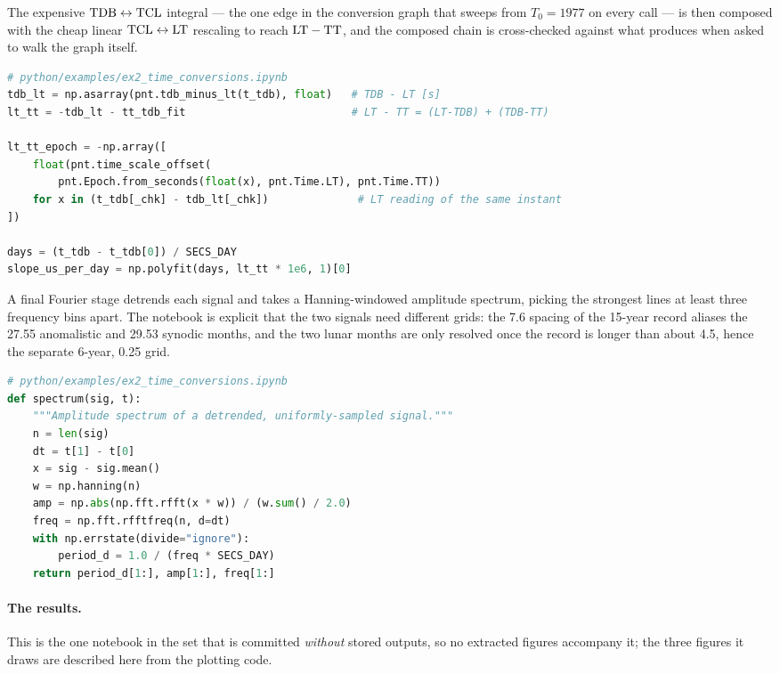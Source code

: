 The expensive $\mathrm{TDB}\leftrightarrow\mathrm{TCL}$ integral --- the one edge in the
conversion graph that sweeps from $T_0=1977$ on every call --- is then composed
with the cheap linear $\mathrm{TCL}\leftrightarrow\mathrm{LT}$ rescaling to reach $\mathrm{LT}-\mathrm{TT}$, and
the composed chain is cross-checked against what  produces when asked
to walk the graph itself.

\begin{lstlisting}[language=py, caption={Composing LT - TT from offsets, and checking it against Epoch.}, label={lst:tut-ex2-lt}]
# python/examples/ex2_time_conversions.ipynb
tdb_lt = np.asarray(pnt.tdb_minus_lt(t_tdb), float)   # TDB - LT [s]
lt_tt = -tdb_lt - tt_tdb_fit                          # LT - TT = (LT-TDB) + (TDB-TT)

lt_tt_epoch = -np.array([
    float(pnt.time_scale_offset(
        pnt.Epoch.from_seconds(float(x), pnt.Time.LT), pnt.Time.TT))
    for x in (t_tdb[_chk] - tdb_lt[_chk])              # LT reading of the same instant
])

days = (t_tdb - t_tdb[0]) / SECS_DAY
slope_us_per_day = np.polyfit(days, lt_tt * 1e6, 1)[0]
\end{lstlisting}

A final Fourier stage detrends each signal and takes a Hanning-windowed
amplitude spectrum, picking the strongest lines at least three frequency bins
apart. The notebook is explicit that the two signals need different grids: the
\SI{7.6}{\dayunit} spacing of the 15-year record aliases the \SI{27.55}{\dayunit}
anomalistic and \SI{29.53}{\dayunit} synodic months, and the two lunar months
are only resolved once the record is longer than about \SI{4.5}{\yr}, hence the
separate 6-year, \SI{0.25}{\dayunit} grid.

\begin{lstlisting}[language=py, caption={Amplitude spectrum of a detrended, uniformly sampled offset.}, label={lst:tut-ex2-fft}]
# python/examples/ex2_time_conversions.ipynb
def spectrum(sig, t):
    """Amplitude spectrum of a detrended, uniformly-sampled signal."""
    n = len(sig)
    dt = t[1] - t[0]
    x = sig - sig.mean()
    w = np.hanning(n)
    amp = np.abs(np.fft.rfft(x * w)) / (w.sum() / 2.0)
    freq = np.fft.rfftfreq(n, d=dt)
    with np.errstate(divide="ignore"):
        period_d = 1.0 / (freq * SECS_DAY)
    return period_d[1:], amp[1:], freq[1:]
\end{lstlisting}

\paragraph{The results.}
This is the one notebook in the set that is committed \emph{without} stored
outputs, so no extracted figures accompany it; the three figures it draws are
described here from the plotting code.

